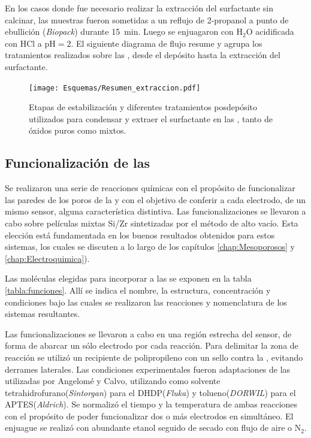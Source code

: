 		En los casos donde fue necesario realizar la extracción del surfactante sin calcinar, las muestras fueron sometidas a un reflujo de 2-propanol a punto de ebullición (\textit{Biopack}) durante \SI{15}{\minute}. Luego se enjuagaron con H$_2$O acidificada con HCl a $\text{pH}=2$. El siguiente diagrama de flujo resume y agrupa los tratamientos realizados sobre las \pdm, desde el depósito hasta la extracción del surfactante.
		
				\begin{figure}[ht!]
						  \begin{center}
						  \texttt{[image: Esquemas/Resumen\_extraccion.pdf]}
						  \caption[Tratamientos pos-depósito de \pdm]{Etapas de estabilización y diferentes tratamientos posdepósito utilizados para condensar y extraer el surfactante en las \pdm, tanto de óxidos puros como mixtos.}
						  \label{esq:peliculas_meso_tratamientos}
						  \end{center}
						  \end{figure}
    \vspace*{-0.3cm}
	\subsection{Funcionalización de las \pdm}
	
		Se realizaron una serie de reacciones químicas con el propósito de funcionalizar las paredes de los poros de la \pdm\space y con el objetivo de conferir a cada electrodo, de un mismo sensor, alguna característica distintiva. Las funcionalizaciones se llevaron a cabo sobre películas mixtas Si/Zr sintetizadas por el método de alto vacío. Esta elección está fundamentada en los buenos resultados obtenidos para estos sistemas, los cuales se discuten a lo largo de los capítulos \ref{chap:Mesoporosos} y \ref{chap:Electroquimica}).

		Las moléculas elegidas para incorporar a las \pdmZ\space se exponen en la tabla \ref{tabla:funciones}. Allí se indica el nombre, la estructura, concentración y condiciones bajo las cuales se realizaron las reacciones y nomenclatura de los sistemas resultantes.

		Las funcionalizaciones se llevaron a cabo en una región estrecha del sensor, de forma de abarcar un sólo electrodo por cada reacción. Para delimitar la zona de reacción se utilizó un recipiente de polipropileno con un sello contra la \pdm, evitando derrames laterales. Las condiciones experimentales fueron adaptaciones de las utilizadas por Angelomé\cite{Angelome2008} y Calvo\cite{Calvo20210}, utilizando como solvente tetrahidrofurano(\textit{Sintorgan}) para el DHDP(\textit{Fluka}) y tolueno(\textit{DORWIL}) para el APTES(\textit{Aldrich}). Se normalizó el tiempo y la temperatura de ambas reacciones con el propósito de poder funcionalizar dos o más electrodos en simultáneo. El enjuague se realizó con abundante etanol seguido de secado con flujo de aire o N$_2$.

